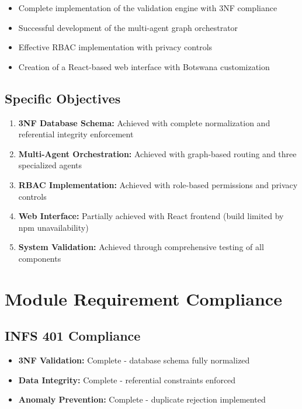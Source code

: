 \begin{itemize}
    \item Complete implementation of the validation engine with 3NF compliance
    \item Successful development of the multi-agent graph orchestrator
    \item Effective RBAC implementation with privacy controls
    \item Creation of a React-based web interface with Botswana customization
\end{itemize}

\subsection{Specific Objectives}

\begin{enumerate}
    \item \textbf{3NF Database Schema:} Achieved with complete normalization and referential integrity enforcement
    
    \item \textbf{Multi-Agent Orchestration:} Achieved with graph-based routing and three specialized agents
    
    \item \textbf{RBAC Implementation:} Achieved with role-based permissions and privacy controls
    
    \item \textbf{Web Interface:} Partially achieved with React frontend (build limited by npm unavailability)
    
    \item \textbf{System Validation:} Achieved through comprehensive testing of all components
\end{enumerate}

\section{Module Requirement Compliance}

\subsection{INFS 401 Compliance}

\begin{itemize}
    \item \textbf{3NF Validation:} Complete - database schema fully normalized
    \item \textbf{Data Integrity:} Complete - referential constraints enforced
    \item \textbf{Anomaly Prevention:} Complete - duplicate rejection implemented
\end{itemize}

